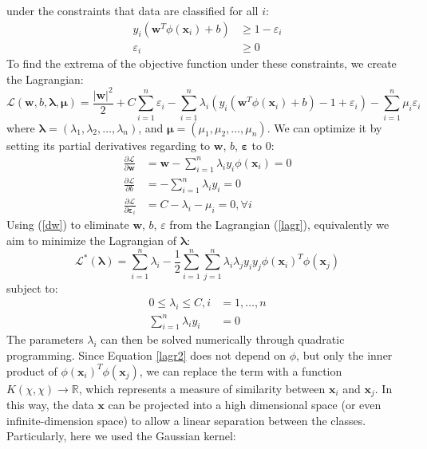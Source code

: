 under the constraints that data are classified for all $i$:
\begin{align*}
    y_i (\mathbf{w}^T\phi(\mathbf{x}_i) + b) &\geq 1 - \varepsilon_i \\ 
    \varepsilon_i &\geq 0
\end{align*}
To find the extrema of the objective function under these constraints, we create the Lagrangian:
\begin{equation} \label{lagr}
    \mathcal{L}(\mathbf{w}, b, \mathbf{\lambda}, \mathbf{\mu})=\frac{|\mathbf{w}|^2}{2} + C\sum_{i=1}^n\varepsilon_i - \sum_{i=1}^n \lambda_i(y_i(\mathbf{w}^T\phi(\mathbf{x}_i) + b) - 1 + \varepsilon_i) - \sum_{i=1}^n \mu_i\varepsilon_i
\end{equation}
where $\mathbf{\lambda}=(\lambda_1, \lambda_2, \ldots, \lambda_n)$, and $\mathbf{\mu}=(\mu_1, \mu_2, \ldots, \mu_n)$. We can optimize it by setting its partial derivatives regarding to $\mathbf{w}$, $b$, $\mathbf{\varepsilon}$ to 0:
\begin{align}\label{dw}
    \frac{\partial\mathcal{L}}{\partial\mathbf{w}} &= \mathbf{w} - \sum_{i=1}^n \lambda_i  y_i  \phi(\mathbf{x}_i) = 0 \nonumber\\ 
    \frac{\partial\mathcal{L}}{\partial{b}} &= - \sum_{i=1}^n \lambda_i y_i = 0 \\
    \frac{\partial\mathcal{L}}{\partial{\mathbf{\varepsilon}_i}} &= C - \lambda_i - \mu_i = 0, \forall i  \nonumber 
\end{align}
Using (\ref{dw}) to eliminate $\mathbf{w}$, $b$, $\varepsilon$ from the Lagrangian (\ref{lagr}), equivalently we aim to minimize the Lagrangian of $\mathbf{\lambda}$:
\begin{equation} \label{lagr2}
    \mathcal{L}^*(\mathbf{\lambda}) = \sum_{i=1}^{n} \lambda_i - \frac{1}{2}\sum_{i=1}^n \sum_{j=1}^n \lambda_i \lambda_j y_i y_j \phi(\mathbf{x}_i)^T\phi(\mathbf{x}_j)
\end{equation}
subject to:
\begin{align*}
    0 \leq \lambda_i \leq C, i &= 1,\ldots,n \\
    \sum_{i=1}^n \lambda_i y_i &= 0
\end{align*}
The parameters $\lambda_i$ can then be solved numerically through quadratic programming. Since Equation \ref{lagr2} does not depend on $\phi$, but only the inner product of $\phi(\mathbf{x}_i)^T\phi(\mathbf{x}_j)$, we can replace the term with a function $K(\chi, \chi) \to \mathbb{R}$, which represents a measure of similarity between $\mathbf{x}_i$ and $ \mathbf{x}_j$. In this way, the data $\mathbf{x}$ can be projected into a high dimensional space (or even infinite-dimension space) to allow a linear separation between the classes. Particularly, here we used the Gaussian kernel:
